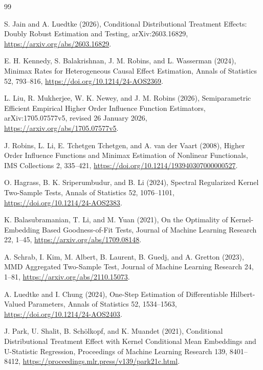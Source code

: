 \documentclass{article}
\begin{document}
\begin{thebibliography}{99}

   S. Jain and A. Luedtke (2026), Conditional Distributional Treatment Effects: Doubly Robust Estimation and Testing, arXiv:2603.16829, \url{https://arxiv.org/abs/2603.16829}.

   E. H. Kennedy, S. Balakrishnan, J. M. Robins, and L. Wasserman (2024), Minimax Rates for Heterogeneous Causal Effect Estimation, Annals of Statistics 52, 793--816, \url{https://doi.org/10.1214/24-AOS2369}.

   L. Liu, R. Mukherjee, W. K. Newey, and J. M. Robins (2026), Semiparametric Efficient Empirical Higher Order Influence Function Estimators, arXiv:1705.07577v5, revised 26 January 2026, \url{https://arxiv.org/abs/1705.07577v5}.

   J. Robins, L. Li, E. Tchetgen Tchetgen, and A. van der Vaart (2008), Higher Order Influence Functions and Minimax Estimation of Nonlinear Functionals, IMS Collections 2, 335--421, \url{https://doi.org/10.1214/193940307000000527}.

   O. Hagrass, B. K. Sriperumbudur, and B. Li (2024), Spectral Regularized Kernel Two-Sample Tests, Annals of Statistics 52, 1076--1101, \url{https://doi.org/10.1214/24-AOS2383}.

   K. Balasubramanian, T. Li, and M. Yuan (2021), On the Optimality of Kernel-Embedding Based Goodness-of-Fit Tests, Journal of Machine Learning Research 22, 1--45, \url{https://arxiv.org/abs/1709.08148}.

   A. Schrab, I. Kim, M. Albert, B. Laurent, B. Guedj, and A. Gretton (2023), MMD Aggregated Two-Sample Test, Journal of Machine Learning Research 24, 1--81, \url{https://arxiv.org/abs/2110.15073}.

   A. Luedtke and I. Chung (2024), One-Step Estimation of Differentiable Hilbert-Valued Parameters, Annals of Statistics 52, 1534--1563, \url{https://doi.org/10.1214/24-AOS2403}.

   J. Park, U. Shalit, B. Schölkopf, and K. Muandet (2021), Conditional Distributional Treatment Effect with Kernel Conditional Mean Embeddings and U-Statistic Regression, Proceedings of Machine Learning Research 139, 8401--8412, \url{https://proceedings.mlr.press/v139/park21c.html}.


\end{thebibliography}
\end{document}
